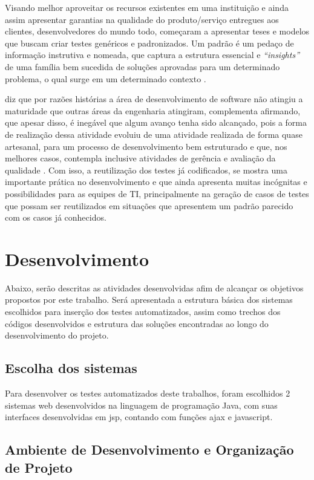 \documentclass[tg]{mdtufsm}
\begin{document}
Visando melhor aproveitar os recursos existentes em uma instituição e ainda assim apresentar garantias na qualidade do produto/serviço entregues aos clientes, desenvolvedores do mundo todo, começaram a apresentar
teses e modelos que buscam criar testes genéricos e padronizados. Um padrão é um pedaço de informação instrutiva e nomeada, que captura a estrutura essencial
e \emph{“insights”} de uma família bem sucedida de soluções aprovadas para um determinado problema, o qual surge em um determinado contexto \cite{cagnin2004reuso}.

\citeauthor{guizzardi2000desenvolvimento} diz que por razões histórias a área de desenvolvimento de software não atingiu a maturidade que outras áreas da engenharia atingiram, complementa afirmando,
que apesar disso, é inegável que algum avanço tenha sido alcançado, pois a forma de realização dessa atividade evoluiu de uma atividade realizada de forma quase artesanal, para um processo de
desenvolvimento bem estruturado e que, nos melhores casos, contempla inclusive atividades de gerência e avaliação da qualidade \cite{guizzardi2000desenvolvimento}.
Com isso, a reutilização dos testes já codificados, se mostra uma importante prática no desenvolvimento e que ainda apresenta muitas incógnitas e possibilidades para as equipes de TI,
principalmente na geração de casos de testes que possam ser reutilizados em situações que apresentem um padrão parecido com os casos já conhecidos.

\chapter{Desenvolvimento}

Abaixo, serão descritas as atividades desenvolvidas afim de alcançar os objetivos propostos por este trabalho. Será apresentada a estrutura básica dos sistemas escolhidos para inserção dos testes automatizados, assim como trechos dos códigos desenvolvidos e estrutura das soluções encontradas ao longo do desenvolvimento do projeto.

\section{Escolha dos sistemas}

Para desenvolver os testes automatizados deste trabalhos, foram escolhidos 2 sistemas web desenvolvidos na linguagem de programação Java, com suas interfaces desenvolvidas em jsp, contando com funções ajax e javascript.

\section{Ambiente de Desenvolvimento e Organização de Projeto}
\end{document}
